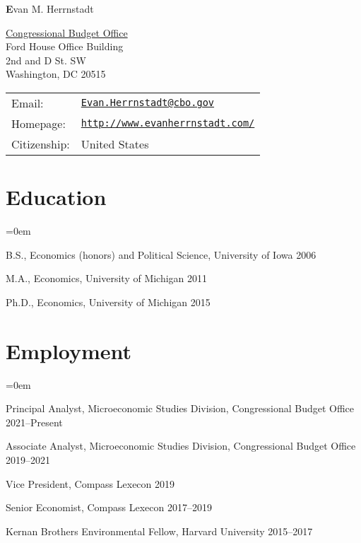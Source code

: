 \documentclass[letterpaper]{article}
\def\name{Evan M. Herrnstadt}
\renewenvironment{itemize}{
  \vspace{-0.5em}
  \begin{list}{}{
	\itemsep=0em
    \setlength{\leftmargin}{1.5em}
  }
}{
  \end{list}
}
\begin{document}
{\Large \textbf\name}


\vspace{0.25in}

\begin{minipage}{0.45\linewidth}
  \href{http://www.cbo.gov/}{Congressional Budget Office} \\
  Ford House Office Building \\
  2nd and D St. SW \\
  Washington, DC 20515
\end{minipage}
\begin{minipage}{0.45\linewidth}
  \begin{tabular}{ll}
    Email: & \href{mailto:Evan.Herrnstadt@cbo.gov}{\tt Evan.Herrnstadt@cbo.gov} \\
    Homepage: & \href{http://www.evanherrnstadt.com/}{\tt http://www.evanherrnstadt.com/} \\
    Citizenship: & United States \\
  \end{tabular}
\end{minipage}


\section*{Education}

\begin{itemize}
  \item B.S., Economics (honors) and Political Science, University of Iowa \hfill 2006

  \item M.A., Economics, University of Michigan \hfill 2011

  \item Ph.D., Economics, University of Michigan \hfill 2015
\end{itemize}


\section*{Employment}
\begin{itemize}
\item Principal Analyst, Microeconomic Studies Division, Congressional Budget Office \hfill 2021--Present
\item Associate Analyst, Microeconomic Studies Division, Congressional Budget Office \hfill 2019--2021
\item Vice President, Compass Lexecon \hfill 2019
\item Senior Economist, Compass Lexecon \hfill  2017--2019
\item Kernan Brothers Environmental Fellow, Harvard University \hfill 2015--2017
\end{itemize}
\end{document}
